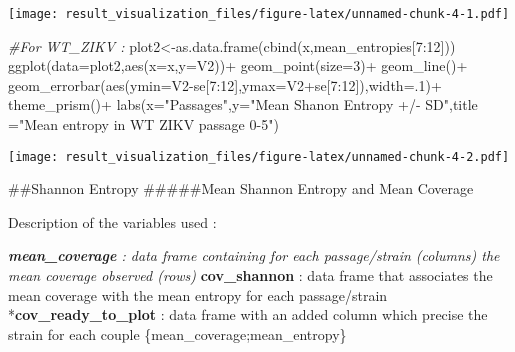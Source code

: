 \documentclass[
]{article}
\newenvironment{Shaded}{\begin{snugshade}}{\end{snugshade}}
\newcommand{\AttributeTok}[1]{\textcolor[rgb]{0.77,0.63,0.00}{#1}}
\newcommand{\CommentTok}[1]{\textcolor[rgb]{0.56,0.35,0.01}{\textit{#1}}}
\newcommand{\DecValTok}[1]{\textcolor[rgb]{0.00,0.00,0.81}{#1}}
\newcommand{\FunctionTok}[1]{\textcolor[rgb]{0.00,0.00,0.00}{#1}}
\newcommand{\NormalTok}[1]{#1}
\newcommand{\OtherTok}[1]{\textcolor[rgb]{0.56,0.35,0.01}{#1}}
\newcommand{\SpecialCharTok}[1]{\textcolor[rgb]{0.00,0.00,0.00}{#1}}
\newcommand{\StringTok}[1]{\textcolor[rgb]{0.31,0.60,0.02}{#1}}
\begin{document}
\texttt{[image: result\_visualization\_files/figure-latex/unnamed-chunk-4-1.pdf]}

\begin{Shaded}
\begin{Highlighting}[]
\CommentTok{\#For WT\_ZIKV :}
\NormalTok{plot2}\OtherTok{\textless{}{-}}\FunctionTok{as.data.frame}\NormalTok{(}\FunctionTok{cbind}\NormalTok{(x,mean\_entropies[}\DecValTok{7}\SpecialCharTok{:}\DecValTok{12}\NormalTok{]))}
\FunctionTok{ggplot}\NormalTok{(}\AttributeTok{data=}\NormalTok{plot2,}\FunctionTok{aes}\NormalTok{(}\AttributeTok{x=}\NormalTok{x,}\AttributeTok{y=}\NormalTok{V2))}\SpecialCharTok{+}
  \FunctionTok{geom\_point}\NormalTok{(}\AttributeTok{size=}\DecValTok{3}\NormalTok{)}\SpecialCharTok{+}
  \FunctionTok{geom\_line}\NormalTok{()}\SpecialCharTok{+}
  \FunctionTok{geom\_errorbar}\NormalTok{(}\FunctionTok{aes}\NormalTok{(}\AttributeTok{ymin=}\NormalTok{V2}\SpecialCharTok{{-}}\NormalTok{se[}\DecValTok{7}\SpecialCharTok{:}\DecValTok{12}\NormalTok{],}\AttributeTok{ymax=}\NormalTok{V2}\SpecialCharTok{+}\NormalTok{se[}\DecValTok{7}\SpecialCharTok{:}\DecValTok{12}\NormalTok{]),}\AttributeTok{width=}\NormalTok{.}\DecValTok{1}\NormalTok{)}\SpecialCharTok{+}
  \FunctionTok{theme\_prism}\NormalTok{()}\SpecialCharTok{+}
  \FunctionTok{labs}\NormalTok{(}\AttributeTok{x=}\StringTok{"Passages"}\NormalTok{,}\AttributeTok{y=}\StringTok{"Mean Shanon Entropy +/{-} SD"}\NormalTok{,}\AttributeTok{title =}\StringTok{"Mean entropy in WT ZIKV passage 0{-}5"}\NormalTok{)}
\end{Highlighting}
\end{Shaded}

\texttt{[image: result\_visualization\_files/figure-latex/unnamed-chunk-4-2.pdf]}

\#\#Shannon Entropy \#\#\#\#\#Mean Shannon Entropy and Mean Coverage

Description of the variables used :

\emph{\textbf{mean\_coverage} : data frame containing for each
passage/strain (columns) the mean coverage observed (rows)
}\textbf{cov\_shannon} : data frame that associates the mean coverage
with the mean entropy for each passage/strain
*\textbf{cov\_ready\_to\_plot} : data frame with an added column which
precise the strain for each couple \{mean\_coverage;mean\_entropy\}
\end{document}
